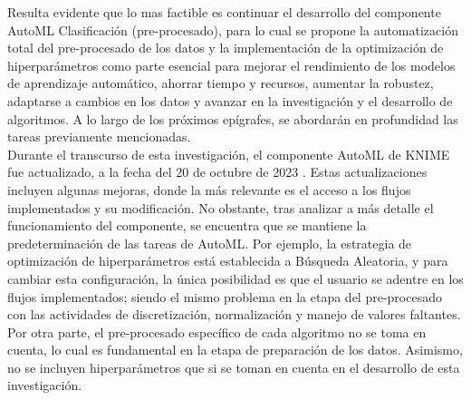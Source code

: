 \begin{table}[H]
\end{table}

Resulta evidente que lo mas factible es continuar el desarrollo del componente AutoML Clasificación (pre-procesado), para lo cual se propone la automatización total del pre-procesado de los datos y la implementación de la optimización de hiperparámetros como parte esencial para mejorar el rendimiento de los modelos de aprendizaje automático, ahorrar tiempo y recursos, aumentar la robustez, adaptarse a cambios en los datos y avanzar en la investigación y el desarrollo de algoritmos. A lo largo de los próximos epígrafes, se abordarán en profundidad las tareas previamente mencionadas. \\
Durante el transcurso de esta investigación, el componente AutoML de KNIME fue actualizado, a la fecha del 20 de octubre de 2023 \citep{KNIME2023-11}. Estas actualizaciones incluyen algunas mejoras, donde la más relevante es el acceso a los flujos implementados y su modificación. No obstante, tras analizar a más detalle el funcionamiento del componente, se encuentra que se mantiene la predeterminación de las tareas de AutoML. Por ejemplo, la estrategia de optimización de hiperparámetros está establecida a Búsqueda Aleatoria, y para cambiar esta configuración, la única posibilidad es que el usuario se adentre en los flujos implementados; siendo el mismo problema en la etapa del pre-procesado con las actividades de discretización, normalización y manejo de valores faltantes. Por otra parte, el pre-procesado específico de cada algoritmo no se toma en cuenta, lo cual es fundamental en la etapa de preparación de los datos. Asimismo, no se incluyen hiperparámetros que si se toman en cuenta en el desarrollo de esta investigación.


